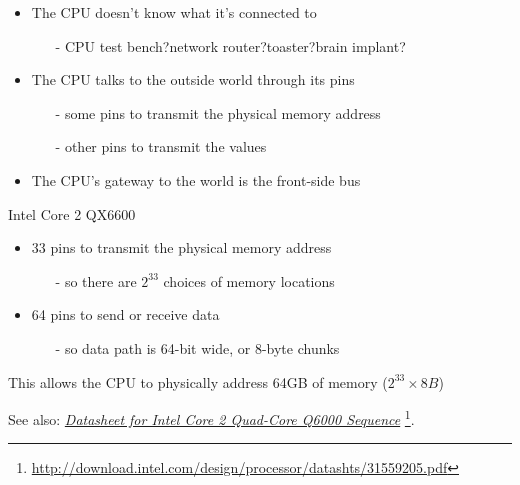 \begin{frame}
  \begin{itemize}
  \item The CPU doesn't know what it's connected to
    \begin{itemize}
    \item[-] CPU test bench?\quad{}network router?\quad{}toaster?\quad{}brain implant?
    \end{itemize}
  \item The CPU talks to the outside world through its pins
    \begin{itemize}
    \item[-] some pins to transmit the physical memory address
    \item[-] other pins to transmit the values
    \end{itemize}
  \item The CPU's gateway to the world is the \alert{front-side bus}
  \end{itemize}
  \begin{block}{Intel Core 2 QX6600}
    \begin{itemize}
    \item 33 pins to transmit the physical memory address
      \begin{itemize}
      \item[-] so there are $2^{33}$ choices of memory locations
      \end{itemize}
    \item 64 pins to send or receive data
      \begin{itemize}
      \item[-] so data path is 64-bit wide, or 8-byte chunks
      \end{itemize}
    \end{itemize}
    This allows the CPU to physically address 64GB of memory ($2^{33}\times{}8B$)    
  \end{block}
\end{frame}

See also:
\href{http://download.intel.com/design/processor/datashts/31559205.pdf}{\emph{Datasheet
    for Intel Core 2 Quad-Core Q6000 Sequence}}
\footnote{\url{http://download.intel.com/design/processor/datashts/31559205.pdf}}.

